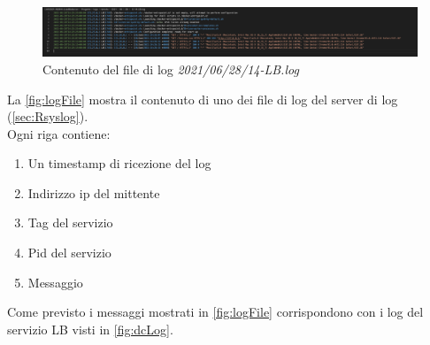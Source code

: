 \documentclass[../DocumentazioneProgetto.tex]{subfiles}
\begin{document}
	\begin{figure}[ht]
		\includegraphics[width=15cm]{images/logFile.png}
		\centering
		\caption{Contenuto del file di log \textit{2021/06/28/14-LB.log}}
		\label{fig:logFile}
	\end{figure}
	La \autoref{fig:logFile} mostra il contenuto di uno dei file di log del server di log (\autoref{sec:Rsyslog}).\\
	Ogni riga contiene:
	\begin{enumerate}
		\item Un timestamp di ricezione del log
		\item Indirizzo ip del mittente
		\item Tag del servizio
		\item Pid del servizio
		\item Messaggio
	\end{enumerate}
	Come previsto i messaggi mostrati in \autoref{fig:logFile} corrispondono con i log del servizio LB visti in \autoref{fig:dcLog}.
\end{document}
